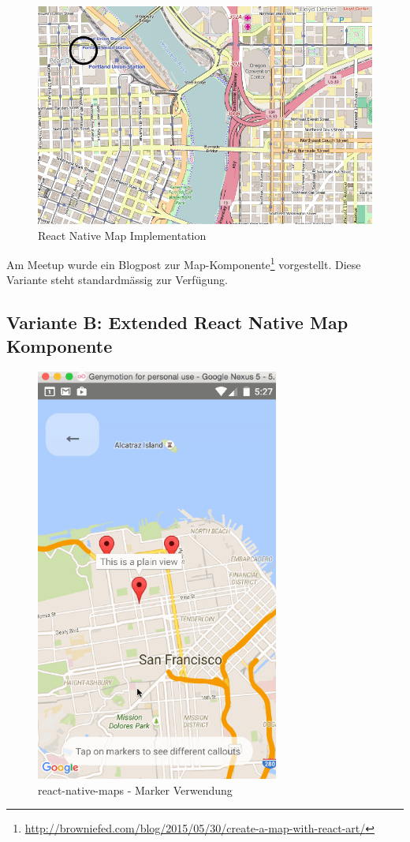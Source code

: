 \begin{figure}[H]
	\centering
	\includegraphics[width=\textwidth]{images/technischer_bericht/react-native_mapview.png}
	\caption{React Native Map Implementation}
	\label{image-variante-a-map}
\end{figure}

Am  Meetup wurde ein Blogpost zur  Map-Komponente\footnote{\url{http://browniefed.com/blog/2015/05/30/create-a-map-with-react-art/}} vorgestellt. Diese Variante steht standardmässig zur Verfügung.

\subsection{Variante B: Extended React Native Map Komponente}

\begin{figure}[H]
	\centering
	\includegraphics[width=8cm]{images/technischer_bericht/lelandrichardson_react-native-maps.png}
	\caption{react-native-maps - Marker Verwendung}
	\label{image-variante-b-map}
\end{figure}

